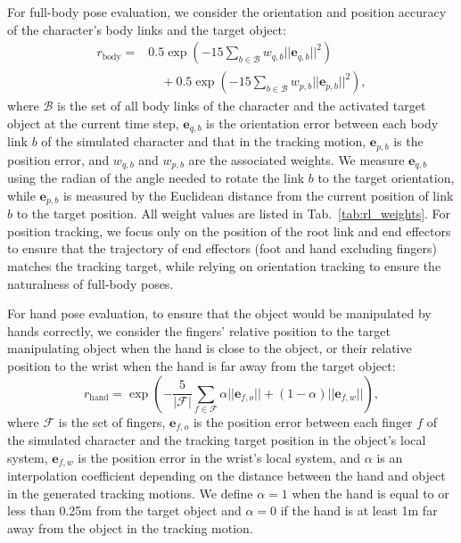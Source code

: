 For full-body pose evaluation,
we consider the orientation and position accuracy of the character's body links and the target object:
\begin{equation}\label{eq:r_body}\begin{split}
    r_\text{body} = & 0.5\exp\left(-15 \sum_{b\in\mathcal{B}} w_{q,b} ||\mathbf{e}_{q,b}||^2\right) \\
    & \quad + 0.5\exp\left(-15 \sum_{b\in\mathcal{B}} w_{p,b} ||\mathbf{e}_{p,b}||^2\right),
\end{split}
\end{equation}
where $\mathcal{B}$ is the set of all body links of the character and the activated target object at the current time step, $\mathbf{e}_{q,b}$ is the orientation error between each body link $b$ of the simulated character and that in the tracking motion, $\mathbf{e}_{p,b}$ is the position error, and $w_{q,b}$ and $w_{p,b}$ are the associated weights.
We measure $\mathbf{e}_{q,b}$ using the radian of the angle needed to rotate the link $b$ to the target orientation,
while $\mathbf{e}_{p,b}$ is measured by the Euclidean distance from the current position of link $b$ to the target position.
All weight values are listed in Tab.~\ref{tab:rl_weights}. For position tracking, we focus only on the position of the root link and end effectors to ensure that the trajectory of end effectors (foot and hand excluding fingers) matches the tracking target,
while relying on orientation tracking to ensure the naturalness of full-body poses.

For hand pose evaluation,
to ensure that the object would be manipulated by hands correctly,
we consider the fingers' relative position to the target manipulating object when the hand is close to the object, or their relative position to the wrist when the hand is far away from the target object:
\begin{equation}
    r_\text{hand} = \exp\left(- \frac{5}{|\mathcal{F}|}\sum_{f\in\mathcal{F}} \alpha ||\mathbf{e}_{f,o}|| + (1-\alpha)  ||\mathbf{e}_{f,w}||\right),
\end{equation}
where $\mathcal{F}$ is the set of fingers, $\mathbf{e}_{f,o}$ is the position error between each finger $f$ of the simulated character and the tracking target position in the object's local system, $\mathbf{e}_{f,w}$ is the position error in the wrist's local system, and $\alpha$ is an interpolation coefficient depending on the distance between the hand and object in the generated tracking motions. We define $\alpha=1$ when the hand is equal to or less than 0.25m from the target object and $\alpha=0$ if the hand is at least 1m far away from the object in the tracking motion.


